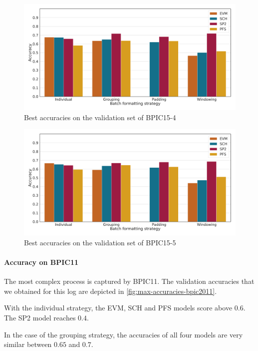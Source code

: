 \begin{figure}
    \centering
    \includegraphics[width=\textwidth]{gfx/bpic2015_4/accuracies.pdf}
    \caption{Best accuracies on the validation set of BPIC15-4}
    \label{fig:max-accuracies-bpic2015-4}
\end{figure}
\begin{figure}
    \centering
    \includegraphics[width=\textwidth]{gfx/bpic2015_5/accuracies.pdf}
    \caption{Best accuracies on the validation set of BPIC15-5}
    \label{fig:max-accuracies-bpic2015-5}
\end{figure}
\FloatBarrier

\paragraph{Accuracy on BPIC11}
The most complex process is captured by BPIC11.
The validation accuracies that we obtained for this log are depicted in \autoref{fig:max-accuracies-bpic2011}.

With the individual strategy, the EVM, SCH and PFS models score above $0.6$.
The SP2 model reaches $0.4$.

In the case of the grouping strategy, the accuracies of all four models are very similar between $0.65$ and $0.7$.

